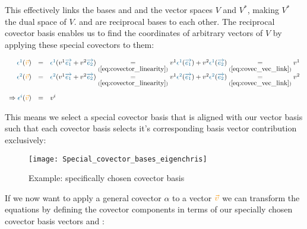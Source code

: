 This effectively links the bases  and  and the vector spaces $V$ and
$V^*$, making $V^*$ the dual space of $V$.  and  are reciprocal bases to
each other. The reciprocal covector basis enables us to find the coordinates of arbitrary
vectors of $V$ by applying these special covectors to them:

\begin{equation}
    \begin{array}{rcl}
        \label{eq:covec_application}
        \hdcbvc{1}(\hdv) & = &
        \hdcbvc{1}(\hdvc{1}\hdbv{1} + \hdvc{2}\hdbv{2})
        \underset{(\ref{eq:covector_linearity})}{=}
        \hdvc{1}\hdcbvc{1}(\hdbv{1}) + \hdvc{2}\hdcbvc{1}(\hdbv{2})
        \underset{(\ref{eq:covec_vec_link})}{=}
        \hdvc{1} \\
        \hdcbvc{2}(\hdv) & = &
        \hdcbvc{2}(\hdvc{1}\hdbv{1} + \hdvc{2}\hdbv{2})
        \underset{(\ref{eq:covector_linearity})}{=}
        \hdvc{1}\hdcbvc{2}(\hdbv{1}) + \hdvc{2}\hdcbvc{2}(\hdbv{2})
        \underset{(\ref{eq:covec_vec_link})}{=}
        \hdvc{2} \\
        \noalign{\vskip10pt}
        \Rightarrow \hdcbvc{i}(\hdv) & = & \hdvc{i}
    \end{array}
\end{equation}

This means we select a special covector basis that is aligned with our vector basis such
that each covector basis selects it's corresponding basis vector contribution exclusively:
\\

\begin{figure}[h]
    \centering
    \texttt{[image: Special\_covector\_bases\_eigenchris]}
    \caption{Example: specifically chosen covector basis}
    \label{fig:selected_covector_basis}
\end{figure}

If we now want to apply a general covector $\alpha$ to a vector $\hdv$ we can transform
the equations by defining the covector components in terms of our specially chosen
covector basis vectors  and :

